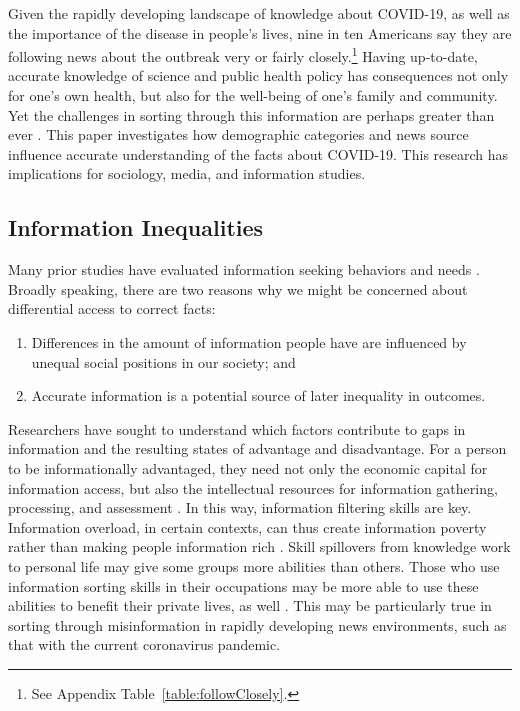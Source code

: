 \documentclass[11pt]{article}
\begin{document}
Given the rapidly developing landscape of knowledge about COVID-19, as well as the importance of the disease in people's lives, nine in ten Americans say they are following news about the outbreak very or fairly closely.\footnote
    {See Appendix Table~\ref{table:followClosely}.}
Having up-to-date, accurate knowledge of science and public health policy has consequences not only for one's own health, but also for the well-being of one's family and community. Yet the challenges in sorting through this information are perhaps greater than ever \citep{Metaxa-Kakavouli2017}. This paper investigates how demographic categories and news source influence accurate understanding of the facts about COVID-19. This research has implications for sociology, media, and information studies.


\subsection{Information Inequalities}

Many prior studies have evaluated information seeking behaviors and needs \citep{Case2016}. Broadly speaking, there are two reasons why we might be concerned about differential access to correct facts:

\begin{enumerate}
\def\labelenumi{(\arabic{enumi})}
\item
  Differences in the amount of information people have are influenced by unequal social positions in our society; and
\item
  Accurate information is a potential source of later inequality in outcomes.
\end{enumerate}

Researchers have sought to understand which factors contribute to gaps in information and the resulting states of advantage and disadvantage. For a person to be informationally advantaged, they need not only the economic capital for information access, but also the intellectual resources for information gathering, processing, and assessment \citep{Sweetland1993}. In this way, information filtering skills are key. Information overload, in certain contexts, can thus create information poverty rather than making people information rich \citep{Yu2006}. Skill spillovers from knowledge work to personal life may give some groups more abilities than others. Those who use information sorting skills in their occupations may be more able to use these abilities to benefit their private lives, as well \citep{Edwards2000,Xanthopoulou2012}. This may be particularly true in sorting through misinformation in rapidly developing news environments, such as that with the current coronavirus pandemic.
\end{document}

